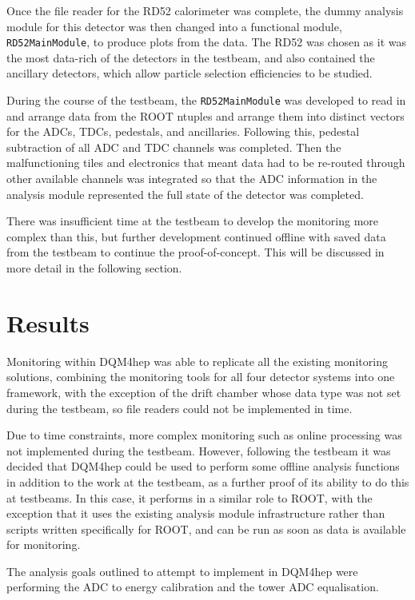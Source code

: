 Once the file reader for the RD52 calorimeter was complete, the dummy analysis module for this detector was then changed into a functional module, \texttt{RD52MainModule}, to produce plots from the data. The RD52 was chosen as it was the most data-rich of the detectors in the testbeam, and also contained the ancillary detectors, which allow particle selection efficiencies to be studied.

During the course of the testbeam, the \texttt{RD52MainModule} was developed to read in and arrange data from the ROOT ntuples and arrange them into distinct vectors for the \acrshort{ADC}s, \acrshort{TDC}s, pedestals, and ancillaries. Following this, pedestal subtraction of all \acrshort{ADC} and \acrshort{TDC} channels was completed. Then the malfunctioning tiles and electronics that meant data had to be re-routed through other available channels was integrated so that the \acrshort{ADC} information in the analysis module represented the full state of the detector was completed. 

There was insufficient time at the testbeam to develop the monitoring more complex than this, but further development continued offline with saved data from the testbeam to continue the proof-of-concept. This will be discussed in more detail in the following section.

\section{Results}
Monitoring within \acrshort{DQM4hep} was able to replicate all the existing monitoring solutions, combining the monitoring tools for all four detector systems into one framework, with the exception of the drift chamber whose data type was not set during the testbeam, so file readers could not be implemented in time. 

Due to time constraints, more complex monitoring such as online processing was not implemented during the testbeam. However, following the testbeam it was decided that \acrshort{DQM4hep} could be used to perform some offline analysis functions in addition to the work at the testbeam, as a further proof of its ability to do this at testbeams. In this case, it performs in a similar role to ROOT, with the exception that it uses the existing analysis module infrastructure rather than scripts written specifically for ROOT, and can be run as soon as data is available for monitoring.

The analysis goals outlined to attempt to implement in \acrshort{DQM4hep} were performing the \acrshort{ADC} to energy calibration and the tower \acrshort{ADC} equalisation.

